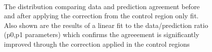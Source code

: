\begin{figure}[tbhp]
\begin{center}
        \\
        \caption{The \mht distribution comparing data and prediction agreement before and after applying the correction from the control region only fit. Also shown are the results of a linear fit to the data/prediction ratio (p0,p1 parameters) which confirms the agreeement is significantly improved through the correction applied in the control regions}
    \end{center}
\end{figure}
